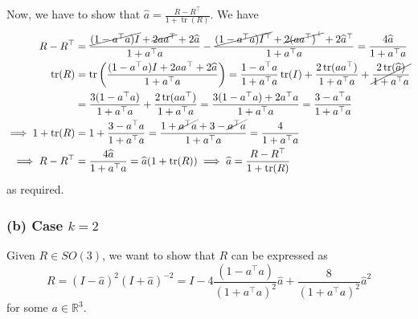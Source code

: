 Now, we have to show that \( \widehat{a} = \frac{R - R^{\top}}{1 + \operatorname{tr}(R)} \).
We have
\begin{align*}
    R - R^\top
     & =
    \frac{\cancel{(1 - a^{\top} a) I} + \cancel{2 a a^{\top}} + 2 \widehat{a}}{1 + a^{\top} a} - \frac{\cancel{(1 - a^{\top} a) I^\top} + \cancel{2 {(a a^{\top})}^\top} + 2 \widehat{a}^\top}{1 + a^{\top} a}
    =
    \frac{4 \widehat{a}}{1 + a^{\top} a}
    \\
    \operatorname{tr}(R)
     & =
    \operatorname{tr}\left( \frac{(1 - a^{\top} a) I + 2 a a^{\top} + 2 \widehat{a}}{1 + a^{\top} a} \right)
    =
    \frac{1 - a^{\top} a}{1 + a^{\top} a} \operatorname{tr}(I) + \frac{2 \operatorname{tr}(a a^{\top})}{1 + a^{\top} a} + \cancel{\frac{2 \operatorname{tr}(\widehat{a})}{1 + a^{\top} a}}
    \\ & =
    \frac{3 (1 - a^{\top} a)}{1 + a^{\top} a} + \frac{2 \operatorname{tr}(a a^{\top})}{1 + a^{\top} a}
    =
    \frac{3 (1 - a^{\top} a) + 2 a^{\top} a}{1 + a^{\top} a}
    =
    \frac{3 - a^{\top} a}{1 + a^{\top} a}
    \\
    \implies
    1 + \operatorname{tr}(R)
     & =
    1 + \frac{3 - a^{\top} a}{1 + a^{\top} a}
    =
    \frac{1 + \cancel{a^{\top} a} + 3 - \cancel{a^{\top} a}}{1 + a^{\top} a}
    =
    \frac{4}{1 + a^{\top} a}
    \\
    \implies
    R - R^\top
     & =
    \frac{4 \widehat{a}}{1 + a^{\top} a}
    =
    \widehat{a} (1 + \operatorname{tr}(R))
    \implies
    \widehat{a}
    =
    \frac{R - R^\top}{1 + \operatorname{tr}(R)}
\end{align*}
as required.

\subsubsection*{(b) Case \( k=2 \)}

Given \( R \in SO(3) \), we want to show that \( R \) can be expressed as
\begin{equation}\label{eq:cayley-k2}
    R
    =
    {(I - \widehat{a})}^{2} {(I + \widehat{a})}^{-2}
    =
    I - 4 \frac{(1 - a^{\top} a)}{{(1 + a^{\top} a)}^{2}} \widehat{a} + \frac{8}{{(1 + a^{\top} a)}^{2}} \widehat{a}^{2}
\end{equation}
for some \( a \in \mathbb{R}^{3} \).


